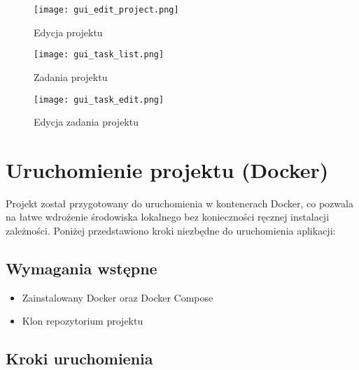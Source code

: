 \documentclass[a4paper,12pt]{article}
\begin{document}
\begin{figure}[h!]
\centering
\texttt{[image: gui\_edit\_project.png]}
\caption{Edycja projektu}
\end{figure}

\begin{figure}[h!]
\centering
\texttt{[image: gui\_task\_list.png]}
\caption{Zadania projektu}
\end{figure}

\begin{figure}[h!]
\centering
\texttt{[image: gui\_task\_edit.png]}
\caption{Edycja zadania projektu}
\end{figure}
  


\newpage
\thispagestyle{empty}
\mbox{}  %

\newpage
\section{Uruchomienie projektu (Docker)}

Projekt został przygotowany do uruchomienia w kontenerach Docker, co pozwala na łatwe wdrożenie środowiska lokalnego bez konieczności ręcznej instalacji zależności. Poniżej przedstawiono kroki niezbędne do uruchomienia aplikacji:

\subsection{Wymagania wstępne}
\begin{itemize}
  \item Zainstalowany Docker oraz Docker Compose
  \item Klon repozytorium projektu
\end{itemize}

\subsection{Kroki uruchomienia}
\end{document}
